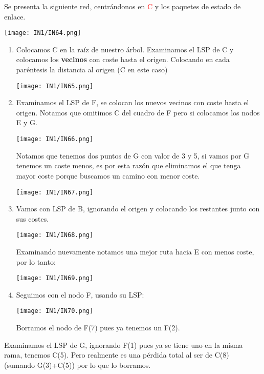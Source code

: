 \documentclass[
	12pt, %
	fleqn, %
	a4paper, %
	oneside, %
]{LegrandOrangeBook}
\begin{document}
\begin{example}
Se presenta la siguiente red, centrándonos en \textcolor{red}{C} y los paquetes de estado de enlace.
\begin{center}
\texttt{[image: IN1/IN64.png]}
\end{center}
\begin{enumerate}
\item Colocamos C en la raíz de nuestro árbol. Examinamos el LSP de C y colocamos los \textbf{vecinos} con coste hasta el origen. Colocando en cada paréntesis la distancia al origen (C en este caso)
\begin{center}
\texttt{[image: IN1/IN65.png]}
\end{center}
\item Examinamos el LSP de F, se colocan los nuevos vecinos con coste hasta el origen. Notamos que omitimos C del cuadro de F pero si colocamos los nodos E y G.
\begin{center}
\texttt{[image: IN1/IN66.png]}
\end{center}
Notamos que tenemos dos puntos de G con valor de 3 y 5, si vamos por G tenemos un coste menos, es por esta razón que eliminamos el que tenga mayor coste porque buscamos un camino con menor coste.
\begin{center}
\texttt{[image: IN1/IN67.png]}
\end{center}
\item Vamos con LSP de B, ignorando el origen y colocando los restantes junto con sus costes.
\begin{center}
\texttt{[image: IN1/IN68.png]}
\end{center}
Examinando nuevamente notamos una mejor ruta hacia E con menos coste, por lo tanto:
\begin{center}
\texttt{[image: IN1/IN69.png]}
\end{center}
\item Seguimos con el nodo F, usando su LSP:
\begin{center}
\texttt{[image: IN1/IN70.png]}
\end{center}
Borramos el nodo de F(7) pues ya tenemos un F(2).
\end{enumerate}
\item Examinamos el LSP de G, ignorando F(1) pues ya se tiene uno en la misma rama, tenemos C(5). Pero realmente es una pérdida total al ser de C(8)  (sumando G(3)+C(5)) por lo que lo borramos.

\end{example}
\end{document}
